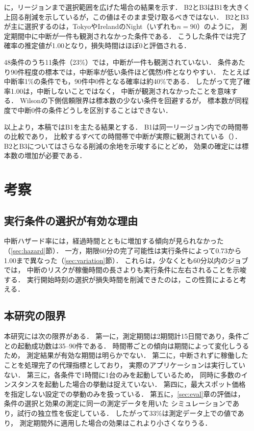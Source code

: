 \documentclass[submit,techrep,noauthor]{ipsj}
\begin{document}
に，リージョンまで選択範囲を広げた場合の結果を示す．
B2とB3はB1を大きく上回る削減を示しているが，この値はそのまま受け取るべきではない．
B2とB3が主に選択するのは，TokyoやIrelandのNight（いずれも$n=90$）のように，
測定期間中に中断が一件も観測されなかった条件である．
こうした条件では完了確率の推定値が1.00となり，損失時間はほぼ0と評価される．

48条件のうち11条件（23\%）では，中断が一件も観測されていない．
条件あたり90件程度の標本では，中断率が低い条件ほど偶然0件となりやすい．
たとえば中断率1\%の条件でも，90件中0件となる確率は約40\%である．
したがって完了確率1.00は，中断しないことではなく，
中断が観測されなかったことを意味する．
Wilsonの下側信頼限界は標本数の少ない条件を回避するが，
標本数が同程度で中断0件の条件どうしを区別することはできない．

以上より，本稿ではB1を主たる結果とする．
B1は同一リージョン内での時間帯の比較であり，
比較するすべての時間帯で中断が実際に観測されている（）．
B2とB3についてはさらなる削減の余地を示唆するにとどめ，
効果の確定には標本数の増加が必要である．


\section{考察}
\label{sec:discussion}

\subsection{実行条件の選択が有効な理由}

中断ハザード率には，経過時間とともに増加する傾向が見られなかった（\ref{sec:hazard}節）．
一方，期限60分の完了可能性は実行条件によって0.73から1.00まで異なった（\ref{sec:variation}節）．
これらは，少なくとも60分以内のジョブでは，
中断のリスクが稼働時間の長さよりも実行条件に左右されることを示唆する．
実行開始時刻の選択が損失時間を削減できたのは，この性質によると考える．

\subsection{本研究の限界}

本研究には次の限界がある．
第一に，測定期間は2期間計15日間であり，条件ごとの起動成功数は35--90件である．
時間帯ごとの傾向は期間によって変化しうるため，
測定結果が有効な期間は明らかでない．
第二に，中断されずに稼働したことを処理完了の代理指標としており，
実際のアプリケーションは実行していない．
第三に，各条件で1時間に1台のみを起動しているため，
同時に多数のインスタンスを起動した場合の挙動は捉えていない．
第四に，最大スポット価格を指定しない設定での挙動のみを扱っている．
第五に，\ref{sec:eval}章の評価は，条件の選択と効果の測定に同一の測定データを用いた
シミュレーションであり，試行の独立性を仮定している．
したがって33\%は測定データ上での値であり，
測定期間外に適用した場合の効果はこれより小さくなりうる．
\end{document}
